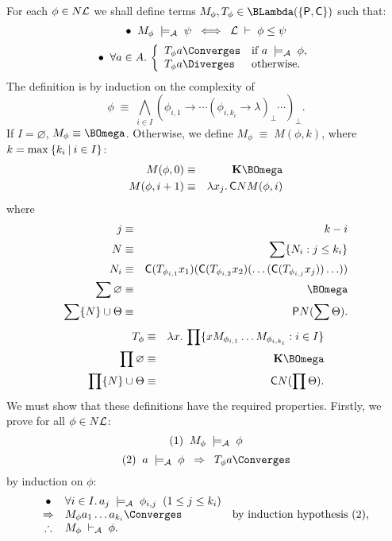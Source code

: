 For each $\phi \in N{\cal L}$ we shall define terms $M_{\phi}, T_{\phi} \in \BLambda(\{{\sf P, C}\})$ such that:
\[ \bullet \;\; M_{\phi} \; \models_{\cal A} \; \psi \;\; \Longleftrightarrow \;\; {\cal L} \; \vdash \; \phi \leq \psi \]
\[ \bullet \;\; \forall a \in A. \, \left\{ \begin{array}{ll}
T_{\phi} a \Converges & \mbox{if $a \; \models_{\cal A} \; \phi$,} \\
T_{\phi} a \Diverges & \mbox{otherwise.}
\end{array} \right. \]
The definition is by induction on the complexity of
\[ \phi \; \equiv \; \bigwedge_{i \in I} (\phi_{i, 1} \rightarrow \cdots (\phi_{i, k_{i}} \rightarrow \lambda )_{\bot} \cdots )_{\bot} . \]
If $I = \varnothing$, $M_{\phi} \equiv \BOmega$. Otherwise, we define $M_{\phi} \; \equiv \; M(\phi , k)$, where $k = {\rm max} \: \{ k_{i} \: | \: i \in I \}$:
\begin{eqnarray*}
M( \phi , 0 ) & \equiv & {\bf K} \BOmega \\
M( \phi , i+1 ) & \equiv & \lambda x_{j} . \, {\sf C} N M(\phi , i ) 
\end{eqnarray*}
where
\begin{eqnarray*}
j & \equiv & k - i \\
N & \equiv & \sum \{ N_{i} : j \leq k_{i} \} \\
N_{i} & \equiv & {\sf C} (T_{\phi_{i, 1}} x_{1}) ({\sf C}(T_{\phi_{i, 2}} x_{2})( \ldots ({\sf C} ( T_{\phi_{i, j}} x_{j} )) \ldots )) \\
\sum \varnothing & \equiv & \BOmega \\
\sum \{ N \} \cup \Theta & \equiv & {\sf P} N ( \sum \Theta ) .
\end{eqnarray*}
\begin{eqnarray*}
T_{\phi} & \equiv & \lambda x . \, \prod \{ x M_{\phi_{i, 1}} \ldots M_{\phi_{i, k_{i}}} : i \in I \} \\
\prod \varnothing & \equiv & {\bf K} \BOmega \\
\prod \{ N \} \cup \Theta & \equiv & {\sf C} N ( \prod \Theta ) .
\end{eqnarray*}
We must show that these definitions have the required properties. Firstly, we prove for all $\phi \in N{\cal L}$:
\[ (1) \;\; M_{\phi} \; \models_{\cal A} \; \phi \]
\[ (2) \;\; a \; \models_{\cal A} \; \phi \;\; \Rightarrow \;\; T_{\phi} a \Converges \]
by induction on $\phi$:
\[ \begin{array}{clr}
\bullet & \forall i \in I. \, a_{j} \; \models_{\cal A} \; \phi_{i, j} \;\; (1 \leq j \leq k_{i}) & \\
\Rightarrow & M_{\phi} a_{1} \ldots a_{k_{i}} {\Converges} & \mbox{by induction hypothesis (2),} \\
\therefore & M_{\phi} \; \vdash_{\cal A} \; \phi . & 
\end{array} \]
